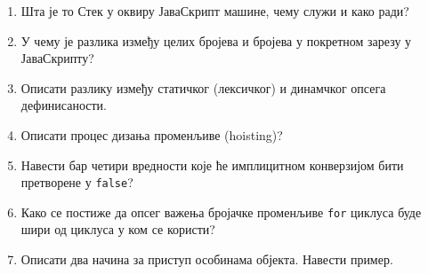 \documentclass[a4paper]{article}
\begin{document}
\begin{enumerate}
\hrulefill

\item Шта је то Стек у оквиру ЈаваСкрипт машине, чему служи и како ради? \hrulefill

\hrulefill

\hrulefill

\hrulefill

\hrulefill

\item У чему је разлика између целих бројева и бројева у покретном зарезу у ЈаваСкрипту? \hrulefill

\hrulefill

\hrulefill 

\hrulefill

\hrulefill

\item Описати разлику између статичког (лексичког) и динамчког опсега дефинисаности. \hrulefill

\hrulefill

\hrulefill 

\hrulefill

\hrulefill

\item Описати процес дизања променљиве (hoisting)? \hrulefill

\hrulefill 

\hrulefill 

\hrulefill

\hrulefill

\item Навести бар четири вредности које ће имплицитном конверзијом бити претворене у \verb|false|? \hrulefill

\hrulefill 


\item Како се постиже да опсег важења бројачке променљиве \verb|for| циклуса буде шири од циклуса у ком се користи?  \hrulefill

\hrulefill

\hrulefill

\hrulefill

\hrulefill

\item Описати два начина за приступ особинама објекта. Навести пример. \hrulefill

\hrulefill

\hrulefill

\hrulefill

\hrulefill


\end{enumerate}
\end{document}
